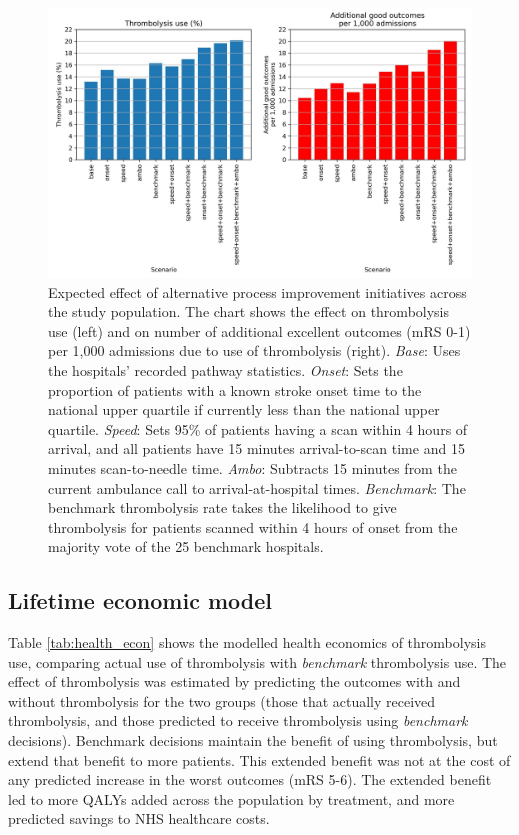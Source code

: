 \begin{figure}
    \centering
    \includegraphics[width=1\linewidth]{images/p5_sim.jpg}
    \caption{Expected effect of alternative process improvement initiatives across the study population. The chart shows the effect on thrombolysis use (left) and on number of additional excellent outcomes (mRS 0-1) per 1,000 admissions due to use of thrombolysis (right). \textit{Base}: Uses the hospitals’ recorded pathway statistics. \textit{Onset}: Sets the proportion of patients with a known stroke onset time to the national upper quartile if currently less than the national upper quartile. \textit{Speed}: Sets 95\% of patients having a scan within 4 hours of arrival, and all patients have 15 minutes arrival-to-scan time and 15 minutes scan-to-needle time. \textit{Ambo}: Subtracts 15 minutes from the current ambulance call to arrival-at-hospital times. \textit{Benchmark}: The benchmark thrombolysis rate takes the likelihood to give thrombolysis for patients scanned within 4 hours of onset from the majority vote of the 25 benchmark hospitals.}
    \label{fig:scenarios_population}
\end{figure}

\FloatBarrier

\subsection{Lifetime economic model}

Table \ref{tab:health_econ} shows the modelled health economics of thrombolysis use, comparing actual use of thrombolysis with \textit{benchmark} thrombolysis use. The effect of thrombolysis was estimated by predicting the outcomes with and without thrombolysis for the two groups (those that actually received thrombolysis, and those predicted to receive thrombolysis using \textit{benchmark} decisions). Benchmark decisions maintain the benefit of using thrombolysis, but extend that benefit to more patients. This extended benefit was not at the cost of any predicted increase in the worst outcomes (mRS 5-6). The extended benefit led to more QALYs added across the population by treatment, and more predicted savings to NHS healthcare costs.

